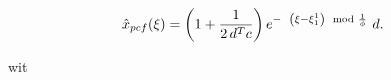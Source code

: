 \begin{enumerate}
\begin{align*}	\label{eq:analysis:comparison_sc_vs_pcf_vs_gj:const_dynamics:pcf_network_estimate_steady_state}
\hat{x}_{pcf}(\xi)
&= 
\left(
1 + 
\frac
{
	1
}
{
	2 \, d^T c
}
\right)
e^
{
	- \hspace{2mm}
	\left(
		\xi - \xi_1^1
	\right)
	\mod
	{
		\frac
		{
			1
		}
		{
			\phi
		}
	}
}
\, \, d.
\end{align*}
\end{enumerate}


wit











